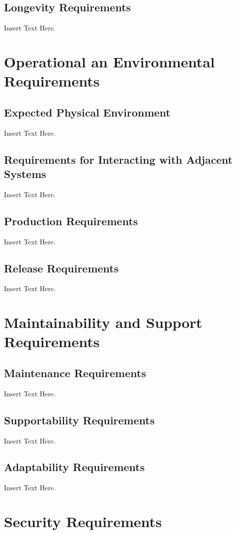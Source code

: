 \documentclass [12pt]{article}
\begin{document}
\subsection{Longevity Requirements }
		Insert Text Here.

\section{Operational an Environmental Requirements}
\subsection{Expected Physical Environment }
		Insert Text Here.
		
\subsection{Requirements for Interacting with Adjacent Systems}
		Insert Text Here.

\subsection{Production Requirements}
		Insert Text Here. 

\subsection{Release Requirements}
		Insert Text Here.		

\section{Maintainability and Support Requirements }
\subsection{Maintenance Requirements }
		Insert Text Here.

\subsection{Supportability Requirements }
		Insert Text Here.

\subsection{Adaptability Requirements}
		Insert Text Here.


\section{Security Requirements }
\end{document}

